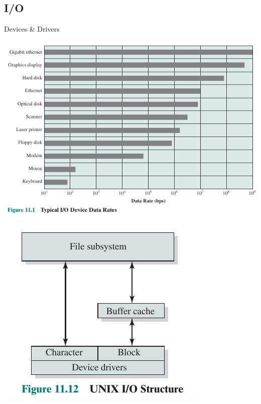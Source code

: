 \documentclass[10pt]{beamer}
\begin{document}
\subsection{I/O}
\begin{frame}[allowframebreaks]{Devices \& Drivers}
   \begin{center}
      \includegraphics[keepaspectratio, width=\textwidth, height=\textheight-2\baselineskip-2\baselineskip]{img/030_io_rates.png} \\ \framebreak
      \includegraphics[keepaspectratio, width=\textwidth, height=\textheight-2\baselineskip-2\baselineskip]{img/030_io_types.png} \\ \framebreak

\end{center}
\end{frame}
\end{document}
